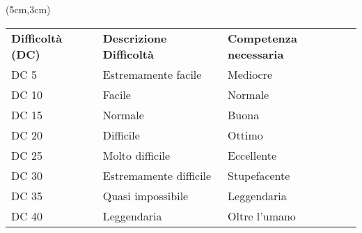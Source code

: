 \documentclass[a4paper,12 pt,openany]{book}
\begin{document}
	\begin{textblock*}{15cm}(5cm,3cm) %
		\footnotesize 	
		\begin{tabular}{lll}
			\textbf{Difficoltà (DC)} & \textbf{Descrizione Difficoltà} & \textbf{ Competenza necessaria} \\
			DC 5                      & Estremamente facile              & Mediocre                        \\
			DC 10                     & Facile                           & Normale                         \\
			DC 15                     & Normale                          & Buona                           \\
			DC 20                     & Difficile                        & Ottimo                          \\
			DC 25                     & Molto difficile                  & Eccellente                      \\
			DC 30                     & Estremamente difficile           & Stupefacente                    \\
			DC 35                     & Quasi impossibile                & Leggendaria                     \\
			DC 40                     & Leggendaria                      & Oltre l'umano                   \\
		\end{tabular}
	\end{textblock*}
	
\end{document}
